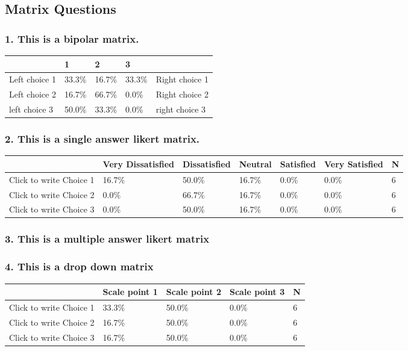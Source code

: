 \documentclass{article}\usepackage[]{graphicx}\usepackage[]{color}
\begin{document}
\subsection*{Matrix Questions}
\subsubsection*{1.
This is a bipolar matrix.}

\begin{tabular}{l|l|l|l|l}
\hline
 & 1 & 2 & 3 & \\
\hline
Left choice 1 & 33.3\% & 16.7\% & 33.3\% & Right choice 1\\
\hline
Left choice 2 & 16.7\% & 66.7\% & 0.0\% & Right choice 2\\
\hline
left choice 3 & 50.0\% & 33.3\% & 0.0\% & right choice 3\\
\hline
\end{tabular}


\hfill \break \hfill \break
\subsubsection*{2.
This is a single answer likert matrix.}

\begin{tabular}{l|l|l|l|l|l|l}
\hline
 & Very Dissatisfied & Dissatisfied  & Neutral & Satisfied & Very Satisfied & N\\
\hline
Click to write Choice 1 & 16.7\% & 50.0\% & 16.7\% & 0.0\% & 0.0\% & 6\\
\hline
Click to write Choice 2 & 0.0\% & 66.7\% & 16.7\% & 0.0\% & 0.0\% & 6\\
\hline
Click to write Choice 3 & 0.0\% & 50.0\% & 16.7\% & 0.0\% & 0.0\% & 6\\
\hline
\end{tabular}


\hfill \break \hfill \break
\subsubsection*{3.
This is a multiple answer likert matrix}

\hfill \break \hfill \break
\subsubsection*{4.
This is a drop down matrix}

\begin{tabular}{l|l|l|l|l}
\hline
 & Scale point 1 & Scale point 2 & Scale point 3 & N\\
\hline
Click to write Choice 1 & 33.3\% & 50.0\% & 0.0\% & 6\\
\hline
Click to write Choice 2 & 16.7\% & 50.0\% & 0.0\% & 6\\
\hline
Click to write Choice 3 & 16.7\% & 50.0\% & 0.0\% & 6\\
\hline
\end{tabular}
\end{document}
